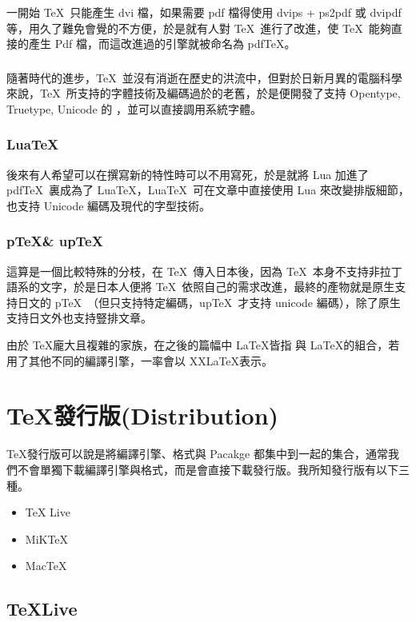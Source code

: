 一開始 \TeX\ 只能產生 dvi 檔，如果需要 pdf 檔得使用 dvips + ps2pdf 或 dvipdf 等，用久了難免會覺的不方便，於是就有人對 \TeX\ 進行了改進，使 \TeX\ 能夠直接的產生 Pdf 檔，而這改進過的引擎就被命名為 pdf\TeX 。

\subsubsection{\XeTeX} 

隨著時代的進步，\TeX\ 並沒有消逝在歷史的洪流中，但對於日新月異的電腦科學來說，\TeX\ 所支持的字體技術及編碼過於的老舊，於是便開發了支持 Opentype, Truetype, Unicode 的 \XeTeX ，並可以直接調用系統字體。

\subsubsection{Lua\TeX}

後來有人希望可以在撰寫新的特性時可以不用寫死，於是就將 Lua 加進了 pdf\TeX\ 裏成為了 Lua\TeX ，Lua\TeX\ 可在文章中直接使用 Lua 來改變排版細節，也支持 Unicode 編碼及現代的字型技術。

\subsubsection{p\TeX \& up\TeX}

這算是一個比較特殊的分枝，在 \TeX\ 傳入日本後，因為 \TeX\ 本身不支持非拉丁語系的文字，於是日本人便將 \TeX\ 依照自己的需求改進，最終的產物就是原生支持日文的 p\TeX\ （但只支持特定編碼，up\TeX\ 才支持 unicode 編碼），除了原生支持日文外也支持豎排文章。

由於 \TeX 龐大且複雜的家族，在之後的篇幅中 \LaTeX 皆指 \XeTeX 與 \LaTeX 的組合，若用了其他不同的編譯引擎，一率會以 XX\LaTeX 表示。

\section{\TeX 發行版(Distribution)}

\TeX 發行版可以說是將編譯引擎、格式與 Pacakge 都集中到一起的集合，通常我們不會單獨下載編譯引擎與格式，而是會直接下載發行版。我所知發行版有以下三種。

\begin{itemize}
\item TeX Live
\item MiKTeX
\item MacTeX
\end{itemize}

\subsection{\TeX Live}

